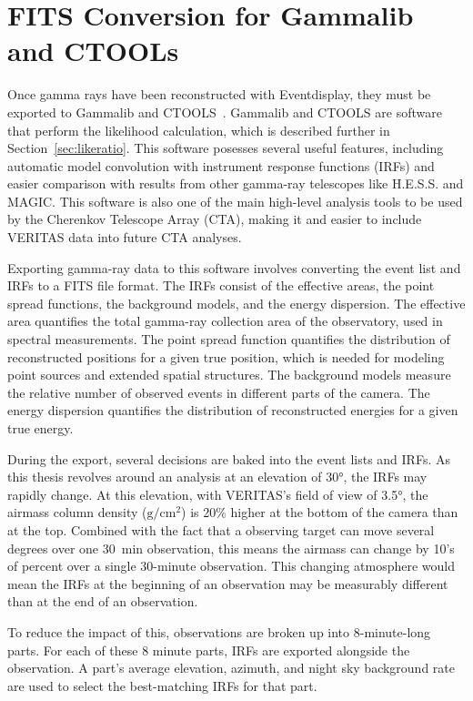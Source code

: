 \section{FITS Conversion for Gammalib and CTOOLs}\label{fitsconversion}
  Once gamma rays have been reconstructed with Eventdisplay, they must be exported to Gammalib and CTOOLS~\cite{gammalibctools}.
  Gammalib and CTOOLS are software that perform the likelihood calculation, which is described further in Section~\ref{sec:likeratio}.
  This software posesses several useful features, including automatic model convolution with instrument response functions (IRFs) and easier comparison with results from other gamma-ray telescopes like H.E.S.S. and MAGIC.
  This software is also one of the main high-level analysis tools to be used by the Cherenkov Telescope Array (CTA), making it and easier to include VERITAS data into future CTA analyses.

  Exporting gamma-ray data to this software involves converting the event list and IRFs to a FITS file format.
  The IRFs consist of the effective areas, the point spread functions, the background models, and the energy dispersion.
  The effective area quantifies the total gamma-ray collection area of the observatory, used in spectral measurements.
  The point spread function quantifies the distribution of reconstructed positions for a given true position, which is needed for modeling point sources and extended spatial structures.
  The background models measure the relative number of observed events in different parts of the camera.
  The energy dispersion quantifies the distribution of reconstructed energies for a given true energy.
  
  During the export, several decisions are baked into the event lists and IRFs.
  As this thesis revolves around an analysis at an elevation of \nicetilde{}\ang{30}, the IRFs may rapidly change.
  At this elevation, with VERITAS's field of view of \ang{3.5}, the airmass column density ($\textrm{g}/\textrm{cm}^2$) is 20\% higher at the bottom of the camera than at the top.
  Combined with the fact that a observing target can move several degrees over one \SI{30}{min} observation, this means the airmass can change by 10's of percent over a single 30-minute observation.
  This changing atmosphere would mean the IRFs at the beginning of an observation may be measurably different than at the end of an observation.

  To reduce the impact of this, observations are broken up into 8-minute-long parts.
  For each of these 8 minute parts, IRFs are exported alongside the observation.
  A part's average elevation, azimuth, and night sky background rate are used to select the best-matching IRFs for that part.
  
